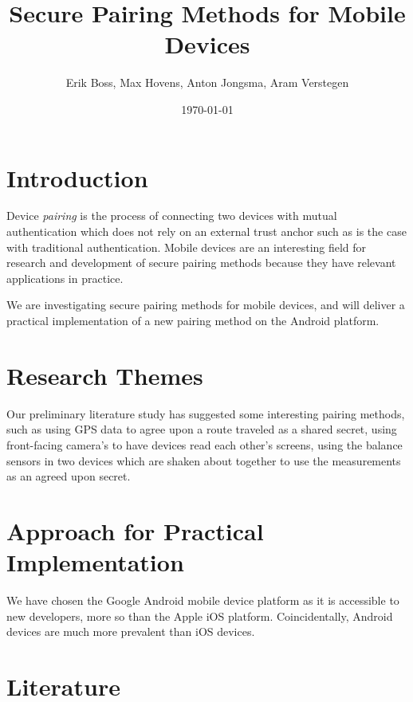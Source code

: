 \documentclass{article}
\title{Secure Pairing Methods for Mobile Devices}
\date{\today}
\author{Erik Boss, Max Hovens, Anton Jongsma, Aram Verstegen}
\begin{document}
\section{Introduction}
Device \textit{pairing} is the process of connecting two devices with mutual authentication which does not rely on an external trust anchor such as is the case with traditional authentication.
Mobile devices are an interesting field for research and development of secure pairing methods because they have relevant applications in practice.

We are investigating secure pairing methods for mobile devices, and will deliver a practical implementation of a new pairing method on the Android platform.

\section{Research Themes}
Our preliminary literature study has suggested some interesting pairing methods, such as using GPS data to agree upon a route traveled as a shared secret, %
using front-facing camera's to have devices read each other's screens, %
using the balance sensors in two devices which are shaken about together to use the measurements as an agreed upon secret.

\section{Approach for Practical Implementation}
We have chosen the Google Android mobile device platform as it is accessible to new developers, more so than the Apple iOS platform.
Coincidentally, Android devices are much more prevalent than iOS devices.

\section{Literature}
\end{document}
